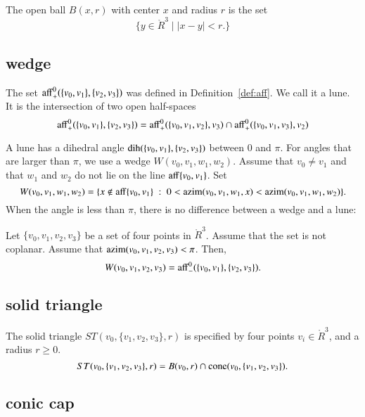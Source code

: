 \begin{definition}  The open ball $B(x,r)$ with center $x$ and
radius $r$ is the set
    $$
    \{ y\in\ring{R}^3 \mid |x-y| < r.\}
    $$
\end{definition}



\subsection{wedge}


The set ${\operatorname{aff}}^0_+(\{v_0,v_1\},\{v_2,v_3\})$ was defined
in Definition~\ref{def:aff}.  We call it a lune.  It is the intersection
of two open half-spaces
    $$
    {\operatorname{aff}}^0_+(\{v_0,v_1\},\{v_2,v_3\})
    ={\operatorname{aff}}^0_+(\{v_0,v_1,v_2\},v_3)\cap
    {\operatorname{aff}}^0_+(\{v_0,v_1,v_3\},v_2)
    $$


A lune has a dihedral angle $\operatorname{dih}(\{v_0,v_1\},\{v_2,v_3\})$ between
$0$ and $\pi$.   For angles that are larger than $\pi$,  we use a wedge
$W(v_0,v_1,w_1,w_2)$.  Assume that $v_0\ne v_1$ and that
$w_1$ and $w_2$ do not lie on
the line ${\operatorname{aff}}\{v_0,v_1\}$.  Set
$$
W(v_0,v_1,w_1,w_2) = 
  \{x\not\in{\operatorname{aff}}\{v_0,v_1\} \ :\  
  0< {\operatorname{azim}}(v_0,v_1,w_1,x) < {\operatorname{azim}}(v_0,v_1,w_1,w_2)\}.
$$
When the angle is less than $\pi$, there is no difference between
a wedge and a lune:

\begin{lemma} Let $\{v_0,v_1,v_2,v_3\}$ be a set of four points
in $\ring{R}^3$.  Assume that the set is not coplanar.
Assume that ${\operatorname{azim}}(v_0,v_1,v_2,v_3)<\pi$.
Then,
   $$W(v_0,v_1,v_2,v_3) = {\operatorname{aff}}^0_-(\{v_0,v_1\},\{v_2,v_3\}).$$
\end{lemma}


\subsection{solid triangle}

\begin{definition} The solid triangle $ST(v_0,\{v_1,v_2,v_3\},r)$ is
specified by four points $v_i\in\ring{R}^3$, and a radius $r\ge0$. 
    $$
    ST(v_0,\{v_1,v_2,v_3\},r) = 
    B(v_0,r)\cap {\operatorname{cone}}(v_0,\{v_1,v_2,v_3\}).
    $$
\end{definition}



\subsection{conic cap}

